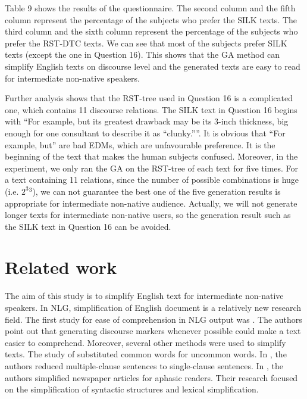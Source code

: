 \documentclass[english]{jnlp_1.2.0}
\begin{document}
Table 9 shows the results of the questionnaire. The second column 
and the fifth column represent the percentage of the subjects who 
prefer the SILK texts. The third column and the sixth column represent the 
percentage of the subjects who prefer the RST-DTC texts. We can 
see that most of the subjects prefer SILK texts (except the one 
in Question 16). This shows that the GA method can simplify English 
texts on discourse level and the generated texts are easy to read 
for intermediate non-native speakers. 

Further analysis shows that the RST-tree used in Question 16 is a 
complicated one, which contains 11 discourse relations. The
SILK text in Question 16 begins with ``For example, but its greatest drawback 
may be its 3-inch thickness, big enough for one consultant to describe 
it as ``clunky.''''. It is obvious that ``For example, but'' are bad EDMs, 
which are unfavourable preference. It is the beginning 
of the text that makes the human subjects confused. Moreover,
in the experiment, we only ran the GA on the RST-tree
of each text for five times. For a text containing 11 relations, 
since the number of possible combinations is huge (i.e. $2^3$$^3$), 
we can not guarantee the best one of the five generation results is appropriate
for intermediate non-native audience. Actually, we will not 
generate longer texts for intermediate non-native users, so 
the generation result such as the SILK text in Question 16 can be avoided. 


\section{Related work}

The aim of this study is to simplify English text for intermediate
non-native speakers. In NLG, simplification of 
English document is a relatively new research field. The first 
study for ease of comprehension in NLG output was \cite{Scott90}. 
The authors point out that generating discourse markers whenever 
possible could make a text easier to comprehend. Moreover, several 
other methods were used to simplify texts. The study of \cite{Devlin98} 
substituted common words for uncommon words. In \cite{Chandrasekar97},
the authors reduced multiple-clause sentences to single-clause 
sentences. In \cite{Devlin00}, the authors simplified newspaper articles for 
aphasic readers. Their research focused on the simplification of
syntactic structures and lexical simplification. 
\end{document}
